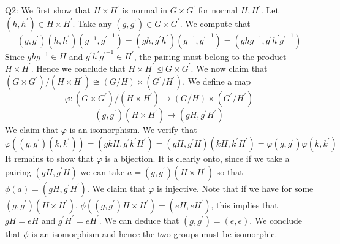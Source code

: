 \documentclass[letterpaper]{article}
\begin{document}
\noindent Q2: We first show that $H \times H^\prime $ is normal in $G \times G^\prime$ for normal $H, H^\prime$. Let $(h,h^\prime)\in H\times H^\prime$. Take any $(g,g^\prime) \in G\times G^\prime$. We compute that $$(g,g^\prime)(h,h^\prime)(g^{-1}, {g^\prime}^{-1}) = (gh,g^\prime h^\prime)(g^{-1}, {g^\prime}^{-1}) = (ghg^{-1}, g^\prime h^{\prime} {g^\prime}^{-1})$$
Since $ghg^{-1}\in H$ and $g^\prime h^{\prime} {g^{\prime}}^{-1}\in H^\prime$, the pairing must belong to the product $H \times H^\prime$. Hence we conclude that $H\times H^\prime \trianglelefteq G \times G^\prime$. We now claim that $(G\times G^\prime) /( H\times H^\prime) \cong (G/ H) \times (G^\prime / H^\prime)$. We define a map $$\varphi: (G\times G^\prime) /( H\times H^\prime) \to  (G/ H) \times (G^\prime / H^\prime)$$ $$(g,g^\prime)(H\times H^\prime) \mapsto (gH, g^\prime H^\prime)$$
We claim that $\varphi$ is an isomorphism. We verify that $$\varphi((g,g^\prime)(k,k^\prime)) = (gkH,g^\prime k^\prime H^\prime) = (gH,g^\prime H)(kH,k^\prime H^\prime) = \varphi(g,g^\prime)\varphi(k,k^\prime)$$
It remains to show that $\varphi$ is a bijection. It is clearly onto, since if we take a pairing $(gH,g^\prime H)$ we can take $a= (g,g^\prime)(H\times H^\prime)$ so that $\phi(a) = (gH,g^\prime H^\prime)$. We claim that $\varphi$ is injective. Note that if we have for some $(g,g^\prime)(H\times H^\prime)$, $\phi((g,g^\prime )H\times H^\prime) = (eH,eH^\prime)$, this implies that $gH = eH$ and $g^\prime H^\prime = eH^\prime$. We can deduce that $(g,g^\prime) = (e,e)$. We conclude that $\phi$ is an isomorphism and hence the two groups must be isomorphic. 
\end{document}
